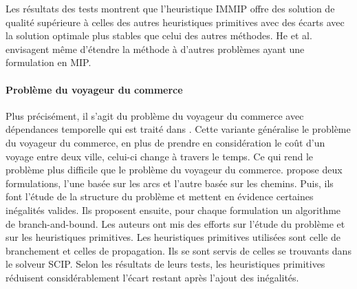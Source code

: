 \documentclass[12pt,a4paper,oneside]{book}
\theoremstyle{definition}
\begin{document}
            Les résultats des tests montrent que l'heuristique IMMIP offre des solution de qualité supérieure à celles des autres heuristiques primitives avec des écarts avec la solution optimale plus stables que celui des autres méthodes. He et al. envisagent même d'étendre la méthode à d'autres problèmes ayant une formulation en MIP.
            
	    \paragraph{Problème du voyageur du commerce}
	    
	        Plus précisément, il s'agit du problème du voyageur du commerce avec dépendances temporelle qui est traité dans \cite{hansknecht2018cuts}. Cette variante généralise le problème du voyageur du commerce, en plus de prendre en considération le coût d'un voyage entre deux ville, celui-ci change à travers le temps. Ce qui rend le problème plus difficile que le problème du voyageur du commerce. \cite{hansknecht2018cuts} propose deux formulations, l'une basée sur les arcs et l'autre basée sur les chemins. Puis, ils font l'étude de la structure  du problème et mettent en évidence certaines inégalités valides. Ils proposent ensuite, pour chaque formulation un algorithme de branch-and-bound. Les auteurs ont mis des efforts sur l'étude du problème et sur les heuristiques primitives. Les heuristiques primitives utilisées sont celle de branchement et celles de propagation. Ils se sont servis de celles se trouvants dans le solveur SCIP. Selon les résultats de leurs tests, les heuristiques primitives réduisent considérablement l'écart restant après l'ajout des inégalités.
	    
	    
\end{document}
